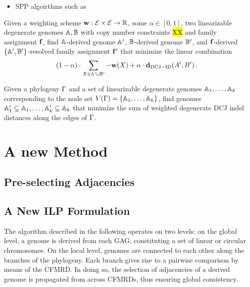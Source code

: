 \documentclass[runningheads]{llncs}
\begin{document}
\begin{itemize}
    \item SPP algoirthms such as 
\end{itemize}

\begin{problem}\label{prb:wdeg_dcj}
    Given a weighting scheme $\mathbf{w} : \mathcal{E} \times \mathcal{E} \to \mathbb R$, some $\alpha \in [0, 1]$, two linearizable degenerate genomes $\mathbb{A}, \mathbb{B}$ with copy number constraints \hl{XX} and family assignment $\mathbf{f}$, find $\mathbb{A}$-derived genome $\mathbb{A}'$, $\mathbb{B}$-derived genome $\mathbb{B}'$, and $\mathbf{f}$-derived $\{\mathbb{A}',\mathbb{B}'\}$-resolved family assignment $\mathbf{f}'$ that minimize the linear combination
    $$
    (1-\alpha) \cdot \sum_{X \in \mathbb{A}' \cup \mathbb{B}'} -\mathbf{w}(X) + \alpha \cdot \mathbf{d}_{\mathrm{DCJ-ID}}(A', B')\,.
    $$
\end{problem}

\begin{problem}\label{prb:spp_dcj}
    Given a phylogeny $\Gamma$ and a set of linearizable degenerate genomes $\mathbb{A}_1, \ldots, \mathbb{A}_k$ corresponding to the node set $V(\Gamma) = \{\mathbb{A}_1, \ldots, \mathbb{A}_k\}$, find genomes $\mathbb{A}'_1 \subseteq \mathbb{A}_1, \ldots, \mathbb{A}'_k \allowbreak \subseteq \mathbb{A}_k$ that minimize the sum of weighted degenerate DCJ indel distances along the edges of $\Gamma$. 
\end{problem}

\section{A new Method}
\subsection{Pre-selecting Adjacencies}
\subsection{A New ILP Formulation}



The algorithm described in the following operates on two levels: 
on the global level, a genome is derived from each GAG, constituting a set of linear or circular chromosomes. 
On the local level, genomes are connected to each other along the branches of the phylogeny. Each branch gives rise to a pairwise comparison by means of the CFMRD. 
In doing so, the selection of adjacencies of a derived genome is propagated from across CFMRDs, thus ensuring global consistency. 
\end{document}
